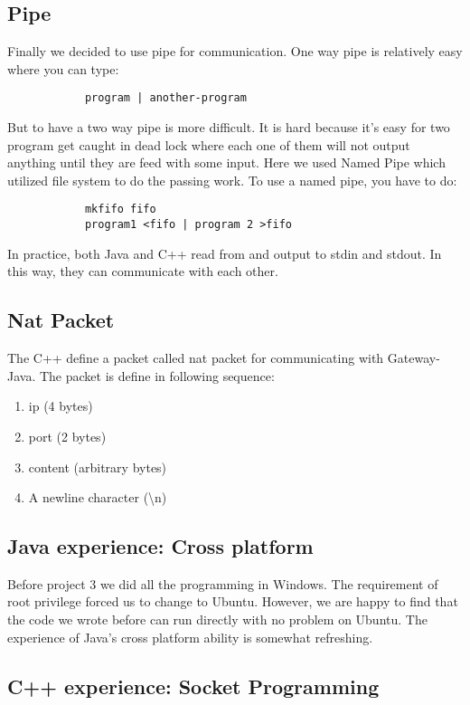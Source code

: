 \documentclass[conference,compsoc]{IEEEtran}
\begin{document}
	\subsection{Pipe}
		Finally we decided to use pipe for communication.
		One way pipe is relatively easy where you can type:
		\begin{center}\begin{lstlisting}
			program | another-program
		\end{lstlisting}\end{center}
		But to have a two way pipe is more difficult.
		It is hard because it's easy for two program get caught in dead lock where each one of them will not output anything until they are feed with some input. 
		Here we used Named Pipe which utilized file system to do the passing work.
		To use a named pipe, you have to do:
		\begin{lstlisting} 
			mkfifo fifo
			program1 <fifo | program 2 >fifo
		\end{lstlisting}
		\par
		In practice, both Java and C++ read from and output to stdin and stdout. 
		In this way, they can communicate with each other.

	\subsection{Nat Packet}
		The C++ define a packet called nat packet for communicating with Gateway-Java. The packet is define in following sequence:
		\begin{enumerate}
		\item ip (4 bytes)
		\item port (2 bytes)
		\item content (arbitrary bytes)
		\item A newline character (\textbackslash n) 
		\end{enumerate}
	
	\subsection{Java experience: Cross platform}
		Before project 3 we did all the programming in Windows.
		The requirement of root privilege forced us to change to Ubuntu.
		However, we are happy to find that the code we wrote before can run directly with no problem on Ubuntu.
		The experience of Java's cross platform ability is somewhat refreshing.

	\subsection{C++ experience: Socket Programming}
\end{document}
